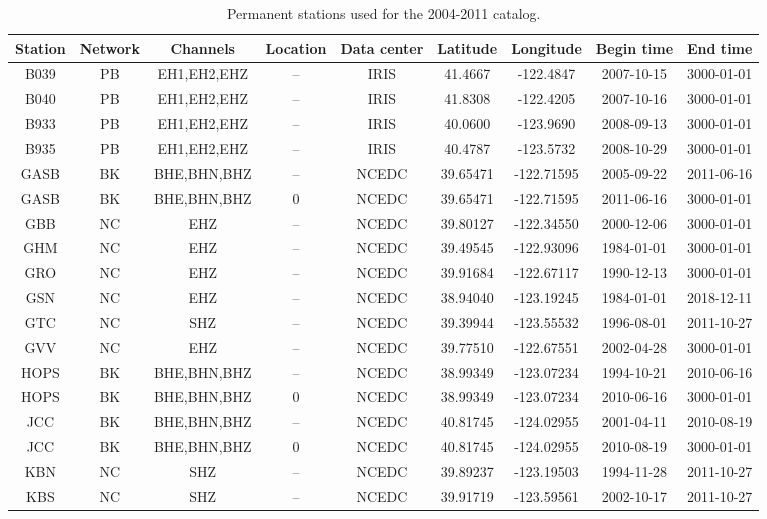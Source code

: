 \documentclass[draft]{agujournal2019}
\begin{document}
\small{
\begin{table}
\caption{Permanent stations used for the 2004-2011 catalog.}
\centering
\footnotesize
\begin{tabular}{c c c c c c c c c}
\hline
Station & Network & Channels & Location & Data center & Latitude & Longitude & Begin time & End time \\
\hline
B039 & PB & EH1,EH2,EHZ & -- & IRIS & 41.4667 &  -122.4847 & 2007-10-15 & 3000-01-01 \\
B040 & PB & EH1,EH2,EHZ & -- & IRIS & 41.8308 &  -122.4205 & 2007-10-16 & 3000-01-01 \\
B933 & PB & EH1,EH2,EHZ & -- & IRIS & 40.0600 &  -123.9690 & 2008-09-13 & 3000-01-01 \\
B935 & PB & EH1,EH2,EHZ & -- & IRIS & 40.4787 &  -123.5732 & 2008-10-29 & 3000-01-01 \\
GASB & BK & BHE,BHN,BHZ & -- & NCEDC & 39.65471 & -122.71595 & 2005-09-22 & 2011-06-16 \\
GASB & BK & BHE,BHN,BHZ & 0 & NCEDC & 39.65471 & -122.71595 & 2011-06-16 & 3000-01-01 \\
GBB & NC & EHZ & -- & NCEDC & 39.80127 & -122.34550 & 2000-12-06 & 3000-01-01 \\
GHM & NC & EHZ & -- & NCEDC & 39.49545 & -122.93096 & 1984-01-01 & 3000-01-01 \\
GRO & NC & EHZ & -- & NCEDC & 39.91684 & -122.67117 & 1990-12-13 & 3000-01-01 \\
GSN & NC & EHZ & -- & NCEDC & 38.94040 & -123.19245 & 1984-01-01 & 2018-12-11 \\
GTC & NC & SHZ & -- & NCEDC & 39.39944 & -123.55532 & 1996-08-01 & 2011-10-27 \\
GVV & NC & EHZ & -- & NCEDC & 39.77510 & -122.67551 & 2002-04-28 & 3000-01-01 \\
HOPS & BK & BHE,BHN,BHZ & -- & NCEDC & 38.99349 & -123.07234 & 1994-10-21 & 2010-06-16 \\
HOPS & BK & BHE,BHN,BHZ & 0 & NCEDC & 38.99349 & -123.07234 & 2010-06-16 & 3000-01-01 \\
JCC & BK & BHE,BHN,BHZ & -- & NCEDC & 40.81745 & -124.02955 & 2001-04-11 & 2010-08-19 \\
JCC & BK & BHE,BHN,BHZ & 0 & NCEDC & 40.81745 & -124.02955 & 2010-08-19 & 3000-01-01 \\
KBN & NC & SHZ & -- & NCEDC & 39.89237 & -123.19503 & 1994-11-28 & 2011-10-27 \\
KBS & NC & SHZ & -- & NCEDC & 39.91719 & -123.59561 & 2002-10-17 & 2011-10-27 \\

\end{tabular}
\end{table}}
\end{document}
